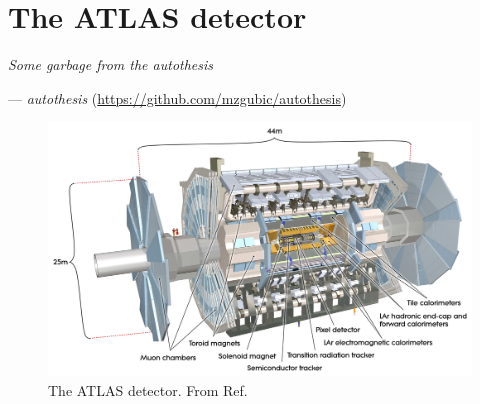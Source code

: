 \chapter{The ATLAS detector}

\textit{Some garbage from the autothesis}
\vspace{5mm}
\begin{flushright}
--- \textit{autothesis} (\url{https://github.com/mzgubic/autothesis})
\end{flushright}

\newpage

\begin{figure}[h]
  \centering
  \includegraphics[width=1\textwidth]{figures/experiment/atlas}
  \caption{The ATLAS detector. From Ref. \cite{CERN:39038}}
   \label{fig:exp:atlas}
\end{figure}
